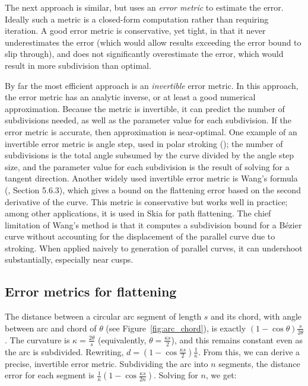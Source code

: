 \documentclass[sigconf, nonacm]{acmart}
\begin{document}

The next approach is similar, but uses an \emph{error metric} to estimate the error. Ideally such a metric is a closed-form computation rather than requiring iteration. A good error metric is conservative, yet tight, in that it never underestimates the error (which would allow results exceeding the error bound to slip through), and does not significantly overestimate the error, which would result in more subdivision than optimal.

By far the most efficient approach is an \emph{invertible} error metric. In this approach, the error metric has an analytic inverse, or at least a good numerical approximation. Because the metric is invertible, it can predict the number of subdivisions needed, as well as the parameter value for each subdivision. If the error metric is accurate, then approximation is near-optimal. One example of an invertible error metric is angle step, used in polar stroking (\citet{Kilgard2020}); the number of subdivisions is the total angle subsumed by the curve divided by the angle step size, and the parameter value for each subdivision is the result of solving for a tangent direction. Another widely used invertible error metric is Wang's formula (\citet{Goldman2003}, Section 5.6.3), which gives a bound on the flattening error based on the second derivative of the curve. This metric is conservative but works well in practice; among other applications, it is used in Skia for path flattening. The chief limitation of Wang's method is that it computes a subdivision bound for a Bézier curve without accounting for the displacement of the parallel curve due to stroking. When applied naively to generation of parallel curves, it can undershoot substantially, especially near cusps.


\subsection{Error metrics for flattening}

The distance between a circular arc segment of length $s$ and its chord, with angle between arc and chord of $\theta$ (see Figure~\ref{fig:arc_chord}), is exactly $(1-\cos \theta)\frac{s}{2\theta}$. The curvature is $\kappa = \frac{2\theta}{s}$ (equivalently, $\theta = \frac{\kappa s}{2}$), and this remains constant even as the arc is subdivided. Rewriting, $d = (1-\cos\frac{\kappa s}{2})\frac{1}{\kappa}$. From this, we can derive a precise, invertible error metric. Subdividing the arc into $n$ segments, the distance error for each segment is $\frac{1}{\kappa}(1-\cos \frac{\kappa s}{2n})$. Solving for $n$, we get:
\end{document}
